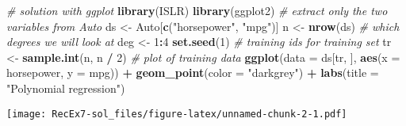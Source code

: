 \documentclass[
]{article}
\newenvironment{Shaded}{\begin{snugshade}}{\end{snugshade}}
\newcommand{\AttributeTok}[1]{\textcolor[rgb]{0.13,0.29,0.53}{#1}}
\newcommand{\CommentTok}[1]{\textcolor[rgb]{0.56,0.35,0.01}{\textit{#1}}}
\newcommand{\DecValTok}[1]{\textcolor[rgb]{0.00,0.00,0.81}{#1}}
\newcommand{\FunctionTok}[1]{\textcolor[rgb]{0.13,0.29,0.53}{\textbf{#1}}}
\newcommand{\NormalTok}[1]{#1}
\newcommand{\OtherTok}[1]{\textcolor[rgb]{0.56,0.35,0.01}{#1}}
\newcommand{\SpecialCharTok}[1]{\textcolor[rgb]{0.81,0.36,0.00}{\textbf{#1}}}
\newcommand{\StringTok}[1]{\textcolor[rgb]{0.31,0.60,0.02}{#1}}
\begin{document}
\begin{Shaded}
\begin{Highlighting}[]
\CommentTok{\# solution with ggplot}
\FunctionTok{library}\NormalTok{(ISLR)}
\FunctionTok{library}\NormalTok{(ggplot2)}
\CommentTok{\# extract only the two variables from Auto}
\NormalTok{ds }\OtherTok{\textless{}{-}}\NormalTok{ Auto[}\FunctionTok{c}\NormalTok{(}\StringTok{"horsepower"}\NormalTok{, }\StringTok{"mpg"}\NormalTok{)]}
\NormalTok{n }\OtherTok{\textless{}{-}} \FunctionTok{nrow}\NormalTok{(ds)}
\CommentTok{\# which degrees we will look at}
\NormalTok{deg }\OtherTok{\textless{}{-}} \DecValTok{1}\SpecialCharTok{:}\DecValTok{4}
\FunctionTok{set.seed}\NormalTok{(}\DecValTok{1}\NormalTok{)}
\CommentTok{\# training ids for training set}
\NormalTok{tr }\OtherTok{\textless{}{-}} \FunctionTok{sample.int}\NormalTok{(n, n }\SpecialCharTok{/} \DecValTok{2}\NormalTok{)}
\CommentTok{\# plot of training data}
\FunctionTok{ggplot}\NormalTok{(}\AttributeTok{data =}\NormalTok{ ds[tr, ], }\FunctionTok{aes}\NormalTok{(}\AttributeTok{x =}\NormalTok{ horsepower, }\AttributeTok{y =}\NormalTok{ mpg)) }\SpecialCharTok{+}
  \FunctionTok{geom\_point}\NormalTok{(}\AttributeTok{color =} \StringTok{"darkgrey"}\NormalTok{) }\SpecialCharTok{+}
  \FunctionTok{labs}\NormalTok{(}\AttributeTok{title =} \StringTok{"Polynomial regression"}\NormalTok{)}
\end{Highlighting}
\end{Shaded}

\texttt{[image: RecEx7-sol\_files/figure-latex/unnamed-chunk-2-1.pdf]}
\end{document}
